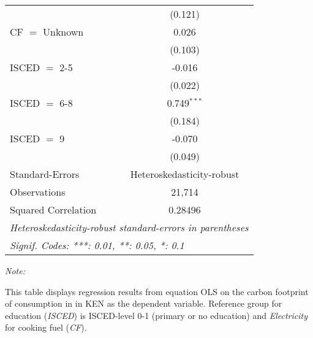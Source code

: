 \begin{table}[htbp!]
\begin{adjustbox}{width = 1\textwidth, max height = 0.95\textheight, center}
\begin{threeparttable}[b]
\begin{tabular}{lc}
                                & (0.121)\\   
            CF $=$ Unknown      & 0.026\\   
                                & (0.103)\\   
            ISCED $=$ 2-5       & -0.016\\   
                                & (0.022)\\   
            ISCED $=$ 6-8       & 0.749$^{***}$\\   
                                & (0.184)\\   
            ISCED $=$ 9         & -0.070\\   
                                & (0.049)\\   
            \midrule 
            Standard-Errors     & Heteroskedasticity-robust \\   
            Observations        & 21,714\\  
            Squared Correlation & 0.28496\\  
            \midrule \midrule
            \multicolumn{2}{l}{\emph{Heteroskedasticity-robust standard-errors in parentheses}}\\
            \multicolumn{2}{l}{\emph{Signif. Codes: ***: 0.01, **: 0.05, *: 0.1}}\\
         \end{tabular}
         
         \begin{tablenotes}\item \medskip \textit{Note:}
            \item This table displays regression results from equation OLS on the carbon footprint of consumption in  in KEN as the dependent variable.  Reference group for education (\textit{ISCED}) is ISCED-level 0-1 (primary or no education) and \textit{Electricity} for cooking fuel (\textit{CF}).
         \end{tablenotes}
      \end{threeparttable}
   \end{adjustbox}
\end{table}


